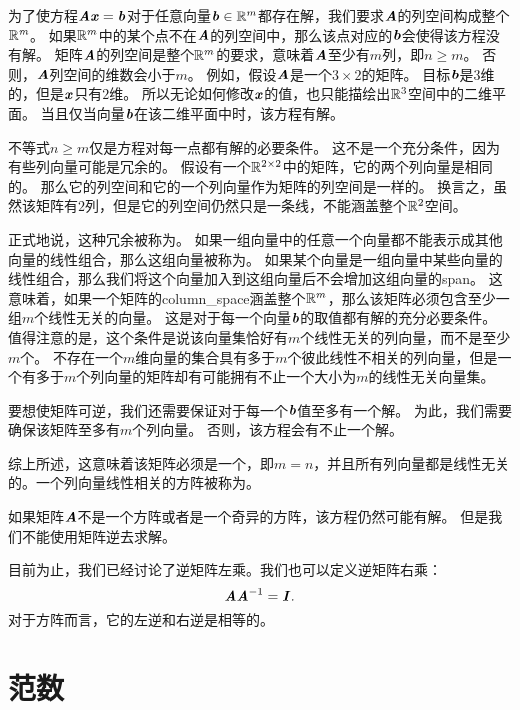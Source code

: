 为了使方程$\boldsymbol{\mathit{A}} \boldsymbol{\mathit{x}}=\boldsymbol{\mathit{b}}$对于任意向量$\boldsymbol{\mathit{b}} \in \mathbb{R}^m$都存在解，我们要求$\boldsymbol{\mathit{A}}$的列空间构成整个$\mathbb{R}^{\mathit{m}}$。
如果$\mathbb{R}^m$中的某个点不在$\boldsymbol{\mathit{A}}$的列空间中，那么该点对应的$\boldsymbol{\mathit{b}}$会使得该方程没有解。
矩阵$\boldsymbol{\mathit{A}}$的列空间是整个$\mathbb{R}^m$的要求，意味着$\boldsymbol{\mathit{A}}$至少有$m$列，即$n\geq m$。
否则，$\boldsymbol{\mathit{A}}$列空间的维数会小于$m$。
例如，假设$\boldsymbol{\mathit{A}}$是一个$3\times 2$的矩阵。
目标$\boldsymbol{\mathit{b}}$是$3$维的，但是$\boldsymbol{\mathit{x}}$只有$2$维。
所以无论如何修改$\boldsymbol{\mathit{x}}$的值，也只能描绘出$\mathbb{R}^3$空间中的二维平面。
当且仅当向量$\boldsymbol{\mathit{b}}$在该二维平面中时，该方程有解。





不等式$n\geq m$仅是方程对每一点都有解的必要条件。
这不是一个充分条件，因为有些列向量可能是冗余的。
假设有一个$\mathbb{R}^{2\times 2}$中的矩阵，它的两个列向量是相同的。
那么它的列空间和它的一个列向量作为矩阵的列空间是一样的。
换言之，虽然该矩阵有$2$列，但是它的列空间仍然只是一条线，不能涵盖整个$\mathbb{R}^2$空间。


正式地说，这种冗余被称为。
如果一组向量中的任意一个向量都不能表示成其他向量的线性组合，那么这组向量被称为。
如果某个向量是一组向量中某些向量的线性组合，那么我们将这个向量加入到这组向量后不会增加这组向量的\gls{span}。
这意味着，如果一个矩阵的\gls{column_space}涵盖整个$\mathbb{R}^m$，那么该矩阵必须包含至少一组$m$个线性无关的向量。
这是对于每一个向量$\boldsymbol{\mathit{b}}$的取值都有解的充分必要条件。
值得注意的是，这个条件是说该向量集恰好有$m$个线性无关的列向量，而不是至少$m$个。
不存在一个$m$维向量的集合具有多于$m$个彼此线性不相关的列向量，但是一个有多于$m$个列向量的矩阵却有可能拥有不止一个大小为$m$的线性无关向量集。


要想使矩阵可逆，我们还需要保证对于每一个$\boldsymbol{\mathit{b}}$值至多有一个解。
为此，我们需要确保该矩阵至多有$m$个列向量。
否则，该方程会有不止一个解。


综上所述，这意味着该矩阵必须是一个，即$m=n$，并且所有列向量都是线性无关的。一个列向量线性相关的方阵被称为。


如果矩阵$\boldsymbol{\mathit{A}}$不是一个方阵或者是一个奇异的方阵，该方程仍然可能有解。
但是我们不能使用矩阵逆去求解。


目前为止，我们已经讨论了逆矩阵左乘。我们也可以定义逆矩阵右乘：
\begin{equation}
\boldsymbol{\mathit{A}}\boldsymbol{\mathit{A}}^{-1}=\boldsymbol{\mathit{I}}.
\end{equation}
对于方阵而言，它的左逆和右逆是相等的。




\section{范数}
\label{sec:norms}

